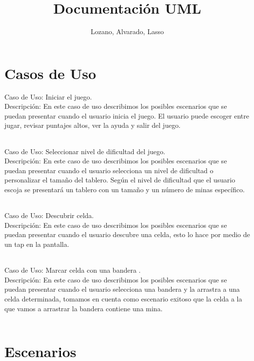 \documentclass[11pt]{article} %
\title{Documentación UML }
\author{Lozano, Alvarado, Lasso}
\begin{document}
\maketitle

\section{Casos de Uso}
Caso de Uso: Iniciar el juego. 
\\Descripción: 
En este caso de uso describimos los posibles escenarios que se puedan presentar cuando el usuario inicia el juego. El usuario puede escoger entre jugar, revisar puntajes altos, ver la ayuda y salir del juego. \
\\  \

Caso de Uso: Seleccionar nivel de dificultad del juego. 
\\Descripción: 
En este caso de uso describimos los posibles escenarios que se puedan presentar cuando el usuario selecciona un nivel de dificultad o personalizar el tamaño del tablero.
Según el nivel de dificultad que el usuario escoja se presentará un tablero con un tamaño y un número de minas específico.\
\\  \

Caso de Uso: Descubrir celda. 
\\Descripción: 
En este caso de uso describimos los posibles escenarios que se puedan presentar cuando el usuario descubre una celda, esto lo hace por medio de un tap en la pantalla. \
\\  \ 
 
Caso de Uso: Marcar celda con una bandera . 
\\Descripción: 
En este caso de uso describimos los posibles escenarios que se puedan presentar cuando el usuario selecciona una bandera y la arrastra a una celda determinada, tomamos en cuenta como escenario exitoso que la celda a la que vamos a arrastrar la bandera contiene una mina.\
\\ \

\section{Escenarios}
\end{document}
